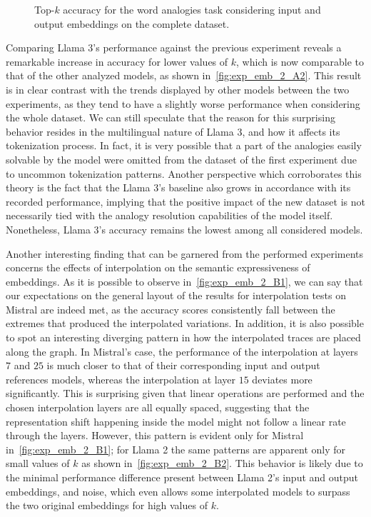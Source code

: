 \begin{figure}[t!]
    \centering
    \caption{Top-$k$ accuracy for the word analogies task considering input and output embeddings on the complete dataset.}
    \label{fig:exp_emb_2_A}
\end{figure}

Comparing Llama 3's performance against the previous experiment reveals a remarkable increase in accuracy for lower values of $k$, which is now comparable to that of the other analyzed models, as shown in~\cref{fig:exp_emb_2_A2}.
This result is in clear contrast with the trends displayed by other models between the two experiments, as they tend to have a slightly worse performance when considering the whole dataset.
We can still speculate that the reason for this surprising behavior resides in the multilingual nature of Llama 3, and how it affects its tokenization process.
In fact, it is very possible that a part of the analogies easily solvable by the model were omitted from the dataset of the first experiment due to uncommon tokenization patterns.
Another perspective which corroborates this theory is the fact that the Llama 3's baseline also grows in accordance with its recorded performance, implying that the positive impact of the new dataset is not necessarily tied with the analogy resolution capabilities of the model itself.
Nonetheless, Llama 3's accuracy remains the lowest among all considered models. 

Another interesting finding that can be garnered from the performed experiments concerns the effects of interpolation on the semantic expressiveness of embeddings.
As it is possible to observe in~\cref{fig:exp_emb_2_B1}, we can say that our expectations on the general layout of the results for interpolation tests on Mistral are indeed met, as the accuracy scores consistently fall between the extremes that produced the interpolated variations.
In addition, it is also possible to spot an interesting diverging pattern in how the interpolated traces are placed along the graph.
In Mistral's case, the performance of the interpolation at layers $7$ and $25$ is much closer to that of their corresponding input and output references models, whereas the interpolation at layer $15$ deviates more significantly.
This is surprising given that linear operations are performed and the chosen interpolation layers are all equally spaced, suggesting that the representation shift happening inside the model might not follow a linear rate through the layers.
However, this pattern is evident only for Mistral in~\cref{fig:exp_emb_2_B1}; for Llama 2 the same patterns are apparent only for small values of $k$ as shown in~\cref{fig:exp_emb_2_B2}.
This behavior is likely due to the minimal performance difference present between Llama 2's input and output embeddings, and noise, which even allows some interpolated models to surpass the two original embeddings for high values of $k$.

